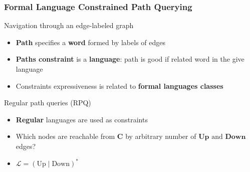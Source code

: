 \documentclass[xcolor=table,aspectratio=169]{beamer}
\begin{document}
\begin{frame}[fragile] \frametitle{Formal Language Constrained Path Querying}
      \begin{minipage}[m]{0.45\linewidth}
  \end{minipage}\hfill
  \begin{minipage}[m]{0.5\linewidth}
  Navigation through an edge-labeled graph
  \begin{itemize}
        \item \textbf{Path} specifies a \textbf{word} formed by labels of edges
        \item \textbf{Paths constraint} is a \textbf{language}: path is good if related word in the give language
        \item Constraints expressiveness is related to \textbf{formal languages classes}
  \end{itemize}
  \pause
  Regular path queries (RPQ)
  \begin{itemize}
        \item \textbf{Regular} languages are used as constraints
        \item Which nodes are reachable from \textbf{C} by arbitrary number of $\textbf{Up} \text{ and } \textbf{Down}$ edges?
        \item $\mathcal{L} = (\text{Up} \mid \text{Down})^*$
  \end{itemize}

  \end{minipage}

\end{frame}
\end{document}
